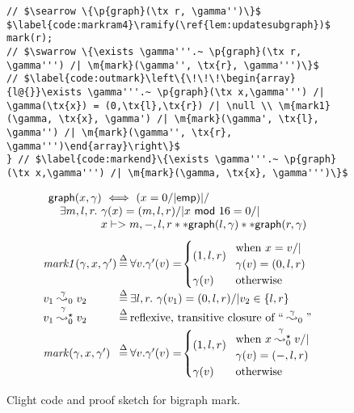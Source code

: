 \begin{figure}[t]
\begin{lstlisting}
// $\searrow \{\p{graph}(\tx r, \gamma'')\}$
$\label{code:markram4}\ramify(\ref{lem:updatesubgraph})$      mark(r);
// $\swarrow \{\exists \gamma'''.~ \p{graph}(\tx r, \gamma''') /| \m{mark}(\gamma'', \tx{r}, \gamma''')\}$
// $\label{code:outmark}\left\{\!\!\!\begin{array}{l@{}}\exists \gamma'''.~ \p{graph}(\tx x,\gamma''') /| \gamma(\tx{x}) = (0,\tx{l},\tx{r}) /| \null \\ \m{mark1}(\gamma, \tx{x}, \gamma') /| \m{mark}(\gamma', \tx{l}, \gamma'') /| \m{mark}(\gamma'', \tx{r}, \gamma''')\end{array}\right\}$
} // $\label{code:markend}\{\exists \gamma'''.~ \p{graph}(\tx x,\gamma''') /| \m{mark}(\gamma, \tx{x}, \gamma''')\}$
\end{lstlisting}
\begin{equation}
\label{eqn:bigraphintrofoldunfold}
\begin{array}{@{}l@{}}
\p{graph}(x, \gamma) ~ <=> ~ (x = 0 /| \p{emp}) |/ \null \\
\quad \exists m,l,r.~ \gamma(x)=(m,l,r) /| x~\mathsf{mod}~16 = 0 /| \null \\
\quad \qquad \quad ~~ x |-> m,-,l,r ** \p{graph}(l, \gamma) ** \p{graph}(r, \gamma)
\end{array}
\end{equation}
\[
\begin{array}{l@{\hspace{2pt}}c@{\hspace{2pt}}l}
\m{mark1}(\gamma,x,\gamma') & \defeq & \forall v. \gamma'(v) = \! \begin{cases}
(1,l,r) \! & \begin{array}{@{}l@{}}\text{when } x = v /| \null \\ \gamma(v) = (0,l,r) \end{array} \\
\gamma(v) & \text{otherwise}
\end{cases} \\
v_1 \mathrel{{\stackrel{\gamma~}{\leadsto_{0}}}} v_2 & \defeq & \exists l,r.~ \gamma(v_1) = (0,l,r) /| v_2 \in \{ l,r\} \\
v_1 \mathrel{{\stackrel{\gamma~}{\leadsto^{\star}_{0}}}} v_2 & \defeq & \text{reflexive, transitive closure of ``}\mathrel{{\stackrel{\gamma}{\leadsto}}_{0}}\text{''} \\
[2pt]
\m{mark}(\gamma,x,\gamma') & \defeq &
\forall v. \gamma'(v) = \! \begin{cases}
(1,l,r) \! & \begin{array}{@{}l@{}}\text{when } x \mathrel{\stackrel{\gamma~}{\leadsto^{\star}_{0}}} v /| \null \\ \gamma(v) = (-,l,r) \end{array}\\
\gamma(v) & \text{otherwise}
\end{cases}
\end{array}
\]
\vspace{-0.4em}
\caption{Clight code and proof sketch for bigraph mark.}
\label{fig:markgraph}
\vspace{-1em}
\end{figure}

